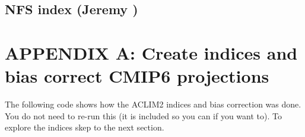 \documentclass[
]{article}
\begin{document}
\hypertarget{nfs-index-jeremy}{%
\subsection{NFS index (Jeremy )}\label{nfs-index-jeremy}}

\hypertarget{appendix-a-create-indices-and-bias-correct-cmip6-projections}{%
\section{APPENDIX A: Create indices and bias correct CMIP6
projections}\label{appendix-a-create-indices-and-bias-correct-cmip6-projections}}

The following code shows how the ACLIM2 indices and bias correction was
done. You do not need to re-run this (it is included so you can if you
want to). To explore the indices skep to the next section.
\end{document}
